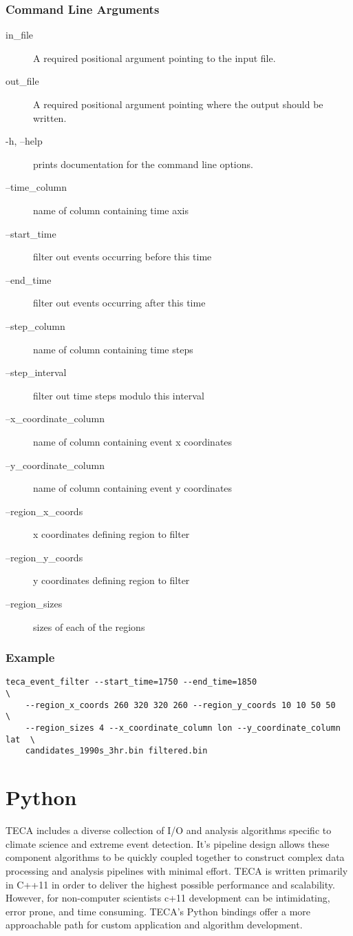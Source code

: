 \documentclass[a4paper,10pt,DIV=12]{scrreprt}
\begin{document}
\subsection{Command Line Arguments}
\begin{description}
\item[in\_file] A required positional argument pointing to the input file.
\item[out\_file] A required positional argument pointing where the output should be written.
\item[-h, --help] prints documentation for the command line options.
\item[--time\_column] name of column containing time axis
\item[--start\_time] filter out events occurring before this time
\item[--end\_time] filter out events occurring after this time
\item[--step\_column] name of column containing time steps
\item[--step\_interval] filter out time steps modulo this interval
\item[--x\_coordinate\_column] name of column containing event x coordinates
\item[--y\_coordinate\_column] name of column containing event y coordinates
\item[--region\_x\_coords] x coordinates defining region to filter
\item[--region\_y\_coords] y coordinates defining region to filter
\item[--region\_sizes] sizes of each of the regions
\end{description}

\subsection{Example}
\begin{verbatim}
teca_event_filter --start_time=1750 --end_time=1850                       \
    --region_x_coords 260 320 320 260 --region_y_coords 10 10 50 50       \
    --region_sizes 4 --x_coordinate_column lon --y_coordinate_column lat  \
    candidates_1990s_3hr.bin filtered.bin
\end{verbatim}

\chapter{Python}
TECA includes a diverse collection of I/O and analysis algorithms specific to climate science and extreme event detection. It's pipeline design allows these component algorithms to be quickly coupled together to construct complex data processing and analysis pipelines with minimal effort. TECA is written primarily in C++11 in order to deliver the highest possible performance and scalability. However, for non-computer scientists c+11 development can be intimidating, error prone, and time consuming. TECA's Python bindings offer a more approachable path for custom application and algorithm development.
\end{document}

